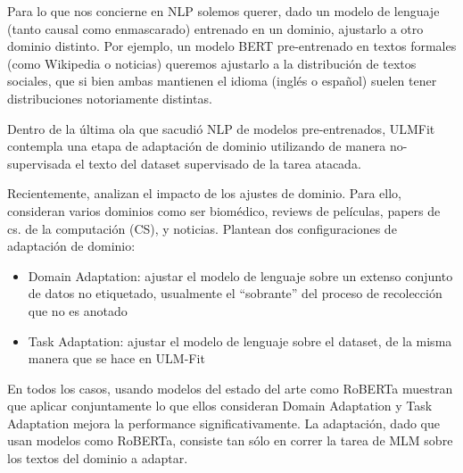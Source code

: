Para lo que nos concierne en NLP solemos querer, dado un modelo de lenguaje (tanto causal como enmascarado) entrenado en un dominio, ajustarlo a otro dominio distinto. Por ejemplo, un modelo BERT pre-entrenado en textos formales (como Wikipedia o noticias) queremos ajustarlo a la distribución de textos sociales, que si bien ambas mantienen el idioma (inglés o español) suelen tener distribuciones notoriamente distintas.

Dentro de la última ola que sacudió NLP de modelos pre-entrenados, ULMFit \citet{howard-ruder-2018-universal} contempla una etapa de adaptación de dominio utilizando de manera no-supervisada el texto del dataset supervisado de la tarea atacada.

Recientemente, \citet{gururangan-etal-2020-dont} analizan el impacto de los ajustes de dominio. Para ello, consideran varios dominios como ser biomédico, reviews de películas, papers de cs. de la computación (CS), y noticias. Plantean dos configuraciones de adaptación de dominio:

\begin{itemize}
    \item Domain Adaptation: ajustar el modelo de lenguaje sobre un extenso conjunto de datos no etiquetado, usualmente el ``sobrante'' del proceso de recolección que no es anotado
    \item Task Adaptation: ajustar el modelo de lenguaje sobre el dataset, de la misma manera que se hace en ULM-Fit
\end{itemize}

En todos los casos, usando modelos del estado del arte como RoBERTa muestran que aplicar conjuntamente lo que ellos consideran Domain Adaptation y Task Adaptation mejora la performance significativamente. La adaptación, dado que usan modelos como RoBERTa, consiste tan sólo en correr la tarea de MLM sobre los textos del dominio a adaptar.


